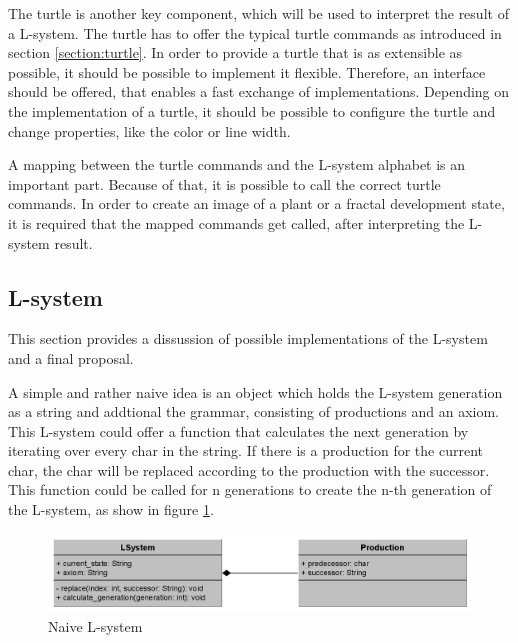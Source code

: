 \documentclass[english]{cpp-hmwk}
\begin{document}
\medskip

\noindent The turtle is another key component, which will be used to interpret the result of a L-system. The turtle has to offer the typical turtle commands as introduced in section \ref{section:turtle}. In order to provide a turtle that is as extensible as possible, it should be possible to implement it flexible. Therefore, an interface should be offered, that enables a fast exchange of implementations. Depending on the implementation of a turtle, it should be possible to configure the turtle and change properties, like the color or line width.

\medskip
\noindent A mapping between the turtle commands and the L-system alphabet is an important part. Because of that, it is possible to call the correct turtle commands. In order to create an image of a plant or a fractal development state, it is required that the mapped commands get called, after interpreting the L-system result.


\subsection{L-system}
\label{section:lsystem_discussion}
This section provides a dissussion of possible implementations of the L-system and a final proposal.

\medskip

\noindent A simple and rather naive idea is an object which holds the L-system generation as a string and addtional the grammar, consisting of productions and an axiom. This L-system could offer a function that calculates the next generation by iterating over every char in the string. If there is a production for the current char, the char will be replaced according to the production with the successor. This function could be called for n generations to create the n-th generation of the L-system, as show in figure \ref{figure:naive_lsystem}.

\begin{figure}[h!]
	\centering
	\includegraphics[width=1\columnwidth]{../graphs/LSystem/naive/class_diagram_l_system_naive.png}
	\caption{Naive L-system}
	\label{figure:naive_lsystem}
\end{figure}
\end{document}
